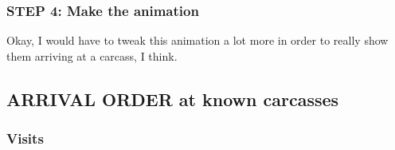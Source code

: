 \documentclass[
]{article}
\newenvironment{Shaded}{\begin{snugshade}}{\end{snugshade}}
\newcommand{\AttributeTok}[1]{\textcolor[rgb]{0.77,0.63,0.00}{#1}}
\newcommand{\DecValTok}[1]{\textcolor[rgb]{0.00,0.00,0.81}{#1}}
\newcommand{\FunctionTok}[1]{\textcolor[rgb]{0.00,0.00,0.00}{#1}}
\newcommand{\NormalTok}[1]{#1}
\newcommand{\OtherTok}[1]{\textcolor[rgb]{0.56,0.35,0.01}{#1}}
\newcommand{\SpecialCharTok}[1]{\textcolor[rgb]{0.00,0.00,0.00}{#1}}
\newcommand{\StringTok}[1]{\textcolor[rgb]{0.31,0.60,0.02}{#1}}
\begin{document}
\hypertarget{step-4-make-the-animation}{%
\subsubsection{STEP 4: Make the
animation}\label{step-4-make-the-animation}}

\begin{Shaded}
\end{Shaded}

Okay, I would have to tweak this animation a lot more in order to really
show them arriving at a carcass, I think.

\hypertarget{arrival-order-at-known-carcasses}{%
\subsection{ARRIVAL ORDER at known
carcasses}\label{arrival-order-at-known-carcasses}}

\hypertarget{visits}{%
\subsubsection{Visits}\label{visits}}
\end{document}
